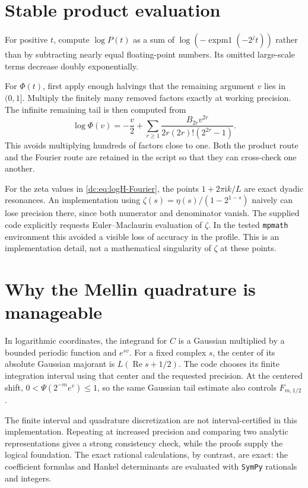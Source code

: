 \documentclass[11pt,a4paper,oneside,openany]{book}
\numberwithin{equation}{chapter}
\theoremstyle{definition}
\theoremstyle{remark}
\newcommand{\ii}{\mathrm i}
\DeclareMathOperator{\Rea}{Re}
\begin{document}
\section{Stable product evaluation}
For positive $t$, compute $\log P(t)$ as a sum of
$\log(-\operatorname{expm1}(-2^jt))$ rather than by subtracting nearly
equal floating-point numbers. Its omitted large-scale terms decrease
doubly exponentially.

For $\Phi(t)$, first apply enough halvings that the remaining argument
$v$ lies in $(0,1]$. Multiply the finitely many removed factors
exactly at working precision. The infinite remaining tail is then
computed from
\begin{equation}
 \log\Phi(v)=-\frac v2+
 \sum_{r\ge1}\frac{B_{2r}v^{2r}}{2r(2r)!(2^{2r}-1)}.
 \label{dc:eq:Phi-numeric}
\end{equation}
This avoids multiplying hundreds of factors close to one. Both the
product route and the Fourier route are retained in the script so
that they can cross-check one another.

For the zeta values in \cref{dc:eq:logH-Fourier}, the points
$1+2\pi\ii k/L$ are exact dyadic resonances. An implementation using
$\zeta(s)=\eta(s)/(1-2^{1-s})$ naively can lose precision there,
since both numerator and denominator vanish. The supplied code
explicitly requests Euler--Maclaurin evaluation of $\zeta$.
In the tested \texttt{mpmath} environment this avoided a visible
loss of accuracy in the profile. This is an implementation detail,
not a mathematical singularity of $\zeta$ at these points.

\section{Why the Mellin quadrature is manageable}
In logarithmic coordinates, the integrand for $C$ is a Gaussian
multiplied by a bounded periodic function and $e^{sv}$.
For a fixed complex $s$, the center of its absolute Gaussian
majorant is $L(\Rea s+1/2)$. The code chooses its finite integration
interval using that center and the requested precision.
At the centered shift, $0<\Psi(2^{-m}e^v)\le1$, so the same
Gaussian tail estimate also controls $F_{m,1/2}$.

The finite interval and quadrature discretization are not
interval-certified in this implementation. Repeating at increased
precision and comparing two analytic representations gives a strong
consistency check, while the proofs supply the logical foundation.
The exact rational calculations, by contrast, are exact: the
coefficient formulas and Hankel determinants are evaluated with
\texttt{SymPy} rationals and integers.
\end{document}
